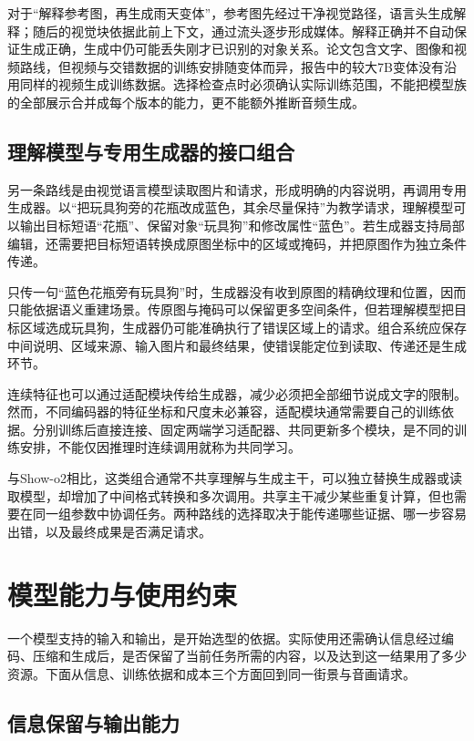 对于“解释参考图，再生成雨天变体”，参考图先经过干净视觉路径，语言头生成解释；随后的视觉块依据此前上下文，通过流头逐步形成媒体。解释正确并不自动保证生成正确，生成中仍可能丢失刚才已识别的对象关系。论文包含文字、图像和视频路线，但视频与交错数据的训练安排随变体而异，报告中的较大7B变体没有沿用同样的视频生成训练数据。选择检查点时必须确认实际训练范围，不能把模型族的全部展示合并成每个版本的能力，更不能额外推断音频生成。

\subsection{理解模型与专用生成器的接口组合}
\label{sec:vision-models-composition}

另一条路线是由视觉语言模型读取图片和请求，形成明确的内容说明，再调用专用生成器。以“把玩具狗旁的花瓶改成蓝色，其余尽量保持”为教学请求，理解模型可以输出目标短语“花瓶”、保留对象“玩具狗”和修改属性“蓝色”。若生成器支持局部编辑，还需要把目标短语转换成原图坐标中的区域或掩码，并把原图作为独立条件传递。

只传一句“蓝色花瓶旁有玩具狗”时，生成器没有收到原图的精确纹理和位置，因而只能依据语义重建场景。传原图与掩码可以保留更多空间条件，但若理解模型把目标区域选成玩具狗，生成器仍可能准确执行了错误区域上的请求。组合系统应保存中间说明、区域来源、输入图片和最终结果，使错误能定位到读取、传递还是生成环节。

连续特征也可以通过适配模块传给生成器，减少必须把全部细节说成文字的限制。然而，不同编码器的特征坐标和尺度未必兼容，适配模块通常需要自己的训练依据。分别训练后直接连接、固定两端学习适配器、共同更新多个模块，是不同的训练安排，不能仅因推理时连续调用就称为共同学习。

与Show-o2相比，这类组合通常不共享理解与生成主干，可以独立替换生成器或读取模型，却增加了中间格式转换和多次调用。共享主干减少某些重复计算，但也需要在同一组参数中协调任务。两种路线的选择取决于能传递哪些证据、哪一步容易出错，以及最终成果是否满足请求。

\section{模型能力与使用约束}
\label{sec:vision-models-constraints}

一个模型支持的输入和输出，是开始选型的依据。实际使用还需确认信息经过编码、压缩和生成后，是否保留了当前任务所需的内容，以及达到这一结果用了多少资源。下面从信息、训练依据和成本三个方面回到同一街景与音画请求。

\subsection{信息保留与输出能力}
\label{sec:vision-models-information}


